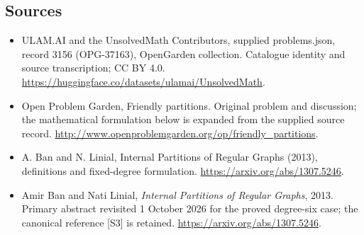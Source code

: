 \documentclass[11pt,a4paper]{article}
\begin{document}
\subsection{Sources}
\begin{itemize}
\item[S1] ULAM.AI and the UnsolvedMath Contributors, supplied problems.json, record 3156 (OPG-37163), OpenGarden collection. Catalogue identity and source transcription; CC BY 4.0.
\url{https://huggingface.co/datasets/ulamai/UnsolvedMath}.
\item[S2] Open Problem Garden, Friendly partitions. Original problem and discussion; the mathematical formulation below is expanded from the supplied source record.
\url{http://www.openproblemgarden.org/op/friendly_partitions}.
\item[S3] A. Ban and N. Linial, Internal Partitions of Regular Graphs (2013), definitions and fixed-degree formulation.
\url{https://arxiv.org/abs/1307.5246}.

\item[R1] Amir Ban and Nati Linial, \emph{Internal Partitions of Regular
Graphs}, 2013. Primary abstract revisited 1 October 2026 for the
proved degree-six case; the canonical reference [S3] is retained.
\url{https://arxiv.org/abs/1307.5246}.

\end{itemize}
\end{document}
